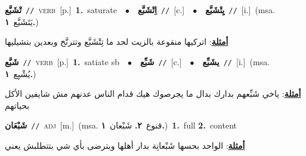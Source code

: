 \documentclass[10pt,a4paper,twoside]{article} %
\begin{document}
\begin{multicols}{2}
{\setlength\topsep{0pt}\textbf{\foreignlanguage{arabic}{تْشَبَّع}}\ {\color{gray}\texttt{//}\color{black}}\ \textsc{verb}\ [p.]\ \textbf{1.}~saturate\ \ $\bullet$\ \ \setlength\topsep{0pt}\textbf{\foreignlanguage{arabic}{اِتْشَبَّع}}\ {\color{gray}\texttt{//}\color{black}}\ [c.]\ \ $\bullet$\ \ \setlength\topsep{0pt}\textbf{\foreignlanguage{arabic}{يِتْشَبَّع}}\ {\color{gray}\texttt{//}\color{black}}\ [i.]\ \color{gray}(msa. \foreignlanguage{arabic}{يَتَشَبَّع}~\foreignlanguage{arabic}{\textbf{١.}})\color{black}\  \begin{flushright}\color{gray}\foreignlanguage{arabic}{\textbf{\underline{\foreignlanguage{arabic}{أمثلة}}}: اتركيها منقوعة بالزيت لحد ما تِتْشَبَّع وتترنَّخ وبعدين بتشيليها}\end{flushright}\color{black}} \vspace{2mm}

{\setlength\topsep{0pt}\textbf{\foreignlanguage{arabic}{شَبَّع}}\ {\color{gray}\texttt{//}\color{black}}\ \textsc{verb}\ [p.]\ \textbf{1.}~satiate sb\ \ $\bullet$\ \ \setlength\topsep{0pt}\textbf{\foreignlanguage{arabic}{شَبِّع}}\ {\color{gray}\texttt{//}\color{black}}\ [c.]\ \ $\bullet$\ \ \setlength\topsep{0pt}\textbf{\foreignlanguage{arabic}{يشَبِّع}}\ {\color{gray}\texttt{//}\color{black}}\ [i.]\ \color{gray}(msa. \foreignlanguage{arabic}{يُشْبِع}~\foreignlanguage{arabic}{\textbf{١.}})\color{black}\  \begin{flushright}\color{gray}\foreignlanguage{arabic}{\textbf{\underline{\foreignlanguage{arabic}{أمثلة}}}: ياخي شَبِّعهم بدارك بدال ما يجرصوك هيك قدام الناس عدنهم مش شايفين الأكل بحياتهم}\end{flushright}\color{black}} \vspace{2mm}

{\setlength\topsep{0pt}\textbf{\foreignlanguage{arabic}{شَبْعَان}}\ {\color{gray}\texttt{//}\color{black}}\ \textsc{adj}\ [m.]\ \color{gray}(msa. \foreignlanguage{arabic}{قنوع}~\foreignlanguage{arabic}{\textbf{٢.}}  \foreignlanguage{arabic}{شَبْعان}~\foreignlanguage{arabic}{\textbf{١.}})\color{black}\ \textbf{1.}~full  \textbf{2.}~content\  \begin{flushright}\color{gray}\foreignlanguage{arabic}{\textbf{\underline{\foreignlanguage{arabic}{أمثلة}}}: الواحد بحسها شَبْعانِة بدار أهلها وبترضى بأي شي بتتطلبش يعني}\end{flushright}\color{black}} \vspace{2mm}


\end{multicols}
\end{document}
